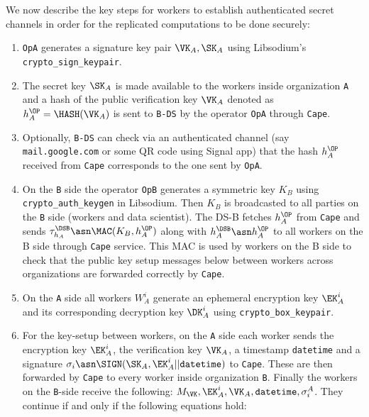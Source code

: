We now describe the key steps for workers to establish authenticated secret
channels in order for the replicated computations to be done securely:
\begin{enumerate}
  \item \verb|OpA| generates a signature key pair $\VK_A, \SK_A$ using Libsodium's \verb|crypto_sign_keypair|.
  
  \item The secret key $\SK_A$ is made available to the workers inside organization \verb|A| and a hash of the public verification key $\VK_A$ denoted as $h_A^\OP = \HASH(\VK_A)$ is sent to \verb|B-DS| by the operator \verb|OpA| through \verb|Cape|.
  
  \item Optionally, \verb|B-DS| can check via an authenticated channel (say
  \verb|mail.google.com| or some QR code using Signal app) that the hash $h_A^\OP$ received
  from \verb|Cape| corresponds to the one sent by \verb|OpA|.

  \item On the \verb|B| side the operator \verb|OpB| generates a symmetric key $K_B$
  using \verb|crypto_auth_keygen| in Libsodium.
  Then $K_B$ is broadcasted to all parties on the \verb|B| side (workers and
  data scientist).
  The DS-B fetches $h_A^\OP$ from \verb|Cape| and sends $\tau_{h_A}^\DSB \asn
  \MAC(K_B, h_A^\OP)$ along with $h_A^\DSB \asn h_A^\OP$ to all workers on the B side
  through \verb|Cape| service. This MAC is used by workers on the B side to check
  that the public key setup messages below between workers across organizations are
  forwarded correctly by \verb|Cape|.

  \item On the \verb|A| side all workers $W_A^i$ generate an ephemeral encryption key $\EK_A^i$ and
  its corresponding decryption key $\DK_A^i$ using \verb|crypto_box_keypair|.

  \item For the key-setup between workers, on the \verb|A| side each worker
  sends the encryption key $\EK_A^i$, the verification key $\VK_A$, a
  timestamp \verb|datetime| and a signature $\sigma_i \asn \SIGN(\SK_A,
  \EK_A^i || \verb|datetime|)$ to \verb|Cape|.  These are then forwarded by \verb|Cape|
  to every worker inside organization \verb|B|.  Finally the workers on the
  \verb|B|-side receive the following: $M_\VK, \EK_A^i, \VK_A,
  \verb|datetime|, \sigma^A_i$.  They continue if and only if the following equations
  hold:
  

\end{enumerate}
